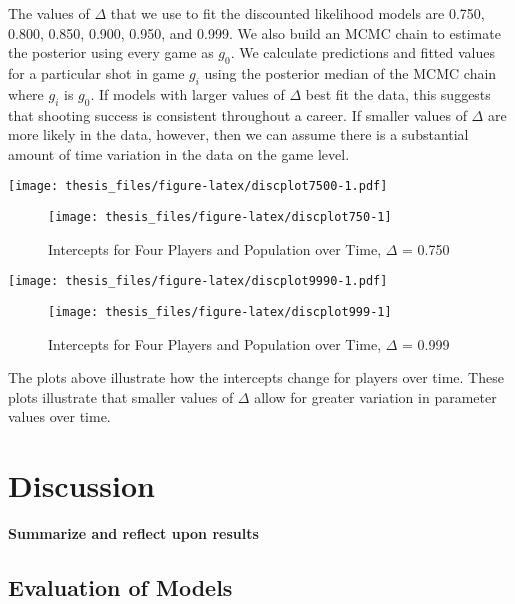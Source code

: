 \documentclass[12pt,twoside]{dukestatscithesis}
\theoremstyle{definition}
\theoremstyle{definition}
\theoremstyle{definition}
\theoremstyle{remark}
\begin{document}
The values of \(\Delta\) that we use to fit the discounted likelihood
models are 0.750, 0.800, 0.850, 0.900, 0.950, and 0.999. We also build
an MCMC chain to estimate the posterior using every game as \(g_0\). We
calculate predictions and fitted values for a particular shot in game
\(g_i\) using the posterior median of the MCMC chain where \(g_i\) is
\(g_0\). If models with larger values of \(\Delta\) best fit the data,
this suggests that shooting success is consistent throughout a career.
If smaller values of \(\Delta\) are more likely in the data, however,
then we can assume there is a substantial amount of time variation in
the data on the game level.

\texttt{[image: thesis\_files/figure-latex/discplot7500-1.pdf]}
\begin{figure}

\hfill{}\texttt{[image: thesis\_files/figure-latex/discplot750-1]} 

\caption{Intercepts for Four Players and Population over Time, $\Delta$ = 0.750}\label{fig:discplot750}
\end{figure}
\texttt{[image: thesis\_files/figure-latex/discplot9990-1.pdf]}
\begin{figure}

\hfill{}\texttt{[image: thesis\_files/figure-latex/discplot999-1]} 

\caption{Intercepts for Four Players and Population over Time, $\Delta$ = 0.999}\label{fig:discplot999}
\end{figure}
The plots above illustrate how the intercepts change for players over
time. These plots illustrate that smaller values of \(\Delta\) allow for
greater variation in parameter values over time.

\chapter{Discussion}\label{disc}

\textbf{Summarize and reflect upon results}

\section{Evaluation of Models}\label{evaluation-of-models}
\end{document}
